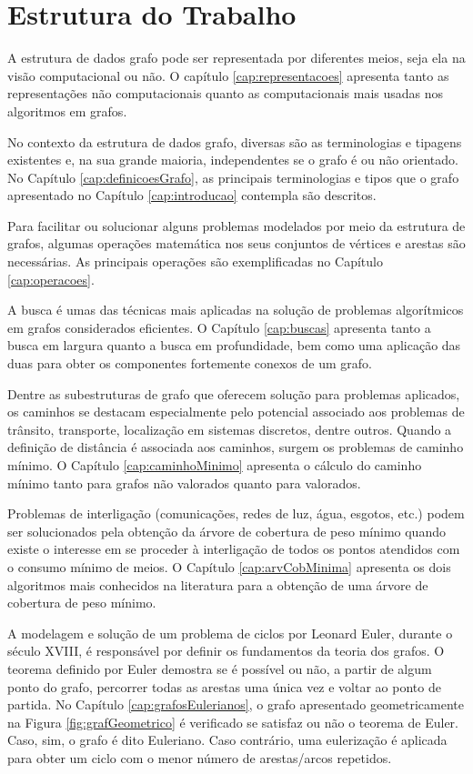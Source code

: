 \documentclass[
12pt,
a4paper,
semrecuonosumario,
sumario = abnt-6027-2012]{report}
\begin{document}
	\section{Estrutura do Trabalho}\label{sec:estruturaTrabalho}
	A estrutura de dados grafo pode ser representada por diferentes meios, seja ela na visão computacional ou não. O capítulo \ref{cap:representacoes} apresenta tanto as representações não computacionais quanto as computacionais mais usadas nos algoritmos em grafos.
	
	No contexto da estrutura de dados grafo, diversas são as terminologias e tipagens existentes e, na sua grande maioria, independentes se o grafo é ou não orientado. No Capítulo \ref{cap:definicoesGrafo}, as principais terminologias e tipos que o grafo apresentado no Capítulo \ref{cap:introducao} contempla são descritos.
	
	Para facilitar ou solucionar alguns problemas modelados por meio da estrutura de grafos,  algumas operações matemática nos seus conjuntos de vértices e arestas são necessárias. As principais operações são exemplificadas no Capítulo \ref{cap:operacoes}.
	
	A busca é umas das técnicas mais aplicadas na solução de problemas algorítmicos em grafos considerados eficientes. O Capítulo \ref{cap:buscas} apresenta tanto a busca em largura quanto a busca em profundidade, bem como uma aplicação das duas para obter os componentes fortemente conexos de um grafo.
	
	Dentre as subestruturas de grafo que oferecem solução para problemas aplicados, os caminhos se destacam especialmente pelo potencial associado aos problemas de trânsito, transporte, localização em sistemas discretos, dentre outros. Quando a definição de distância é associada aos caminhos, surgem os problemas de caminho mínimo. O Capítulo \ref{cap:caminhoMinimo} apresenta o cálculo do caminho mínimo tanto para grafos não valorados quanto para valorados.
	
	Problemas de interligação (comunicações, redes de luz, água, esgotos, etc.) podem ser solucionados pela obtenção da árvore de cobertura de peso mínimo quando existe o interesse em se proceder à interligação de todos os pontos atendidos com o consumo mínimo de meios. O Capítulo \ref{cap:arvCobMinima} apresenta os dois algoritmos mais conhecidos na literatura para a obtenção de uma árvore de cobertura de peso mínimo.
	
	A modelagem e solução de um problema de ciclos por Leonard Euler, durante o século XVIII, é responsável por definir os fundamentos da teoria dos grafos. O teorema definido por Euler demostra se é possível ou não, a partir de algum ponto do grafo, percorrer todas as arestas uma única vez e voltar ao ponto de partida. No Capítulo \ref{cap:grafosEulerianos}, o grafo apresentado geometricamente na Figura \ref{fig:grafGeometrico} é verificado se satisfaz ou não o teorema de Euler. Caso, sim, o grafo é dito Euleriano. Caso contrário, uma eulerização é aplicada para obter um ciclo com o menor número de arestas/arcos repetidos.
	
\end{document}
